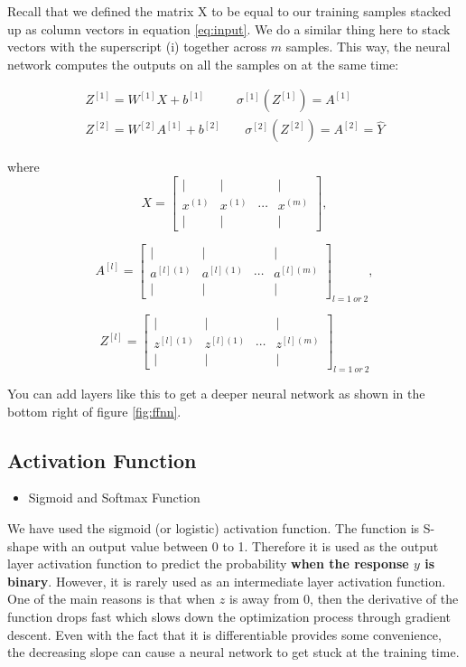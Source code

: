 \documentclass[
  12pt,
]{krantz}
\providecommand{\tightlist}{%
  \setlength{\itemsep}{0pt}\setlength{\parskip}{0pt}}
\begin{document}
Recall that we defined the matrix X to be equal to our training samples stacked up as column vectors in equation \eqref{eq:input}. We do a similar thing here to stack vectors with the superscript (i) together across \(m\) samples. This way, the neural network computes the outputs on all the samples on at the same time:

\[\begin{array}{cc}
Z^{[1]}=W^{[1]}X+b^{[1]} & \ \ \sigma^{[1]}(Z^{[1]})=A^{[1]}\\
Z^{[2]}=W^{[2]}A^{[1]}+b^{[2]} & \ \ \ \ \ \sigma^{[2]}(Z^{[2]})=A^{[2]}=\hat{Y}
\end{array}\]

where
\[X=\left[\begin{array}{cccc}
| & | &  & |\\
x^{(1)} & x^{(1)} & \cdots & x^{(m)}\\
| & | &  & |
\end{array}\right],\]

\[A^{[l]}=\left[\begin{array}{cccc}
| & | &  & |\\
a^{[l](1)} & a^{[l](1)} & \cdots & a^{[l](m)}\\
| & | &  & |
\end{array}\right]_{l=1\ or\ 2},\]

\[Z^{[l]}=\left[\begin{array}{cccc}
| & | &  & |\\
z^{[l](1)} & z^{[l](1)} & \cdots & z^{[l](m)}\\
| & | &  & |
\end{array}\right]_{l=1\ or\ 2}\]

You can add layers like this to get a deeper neural network as shown in the bottom right of figure \ref{fig:ffnn}.

\hypertarget{activationfunction}{%
\subsection{Activation Function}\label{activationfunction}}

\begin{itemize}
\tightlist
\item
  Sigmoid and Softmax Function
\end{itemize}

We have used the sigmoid (or logistic) activation function. The function is S-shape with an output value between 0 to 1. Therefore it is used as the output layer activation function to predict the probability \textbf{when the response \(y\) is binary}. However, it is rarely used as an intermediate layer activation function. One of the main reasons is that when \(z\) is away from 0, then the derivative of the function drops fast which slows down the optimization process through gradient descent. Even with the fact that it is differentiable provides some convenience, the decreasing slope can cause a neural network to get stuck at the training time.
\end{document}

